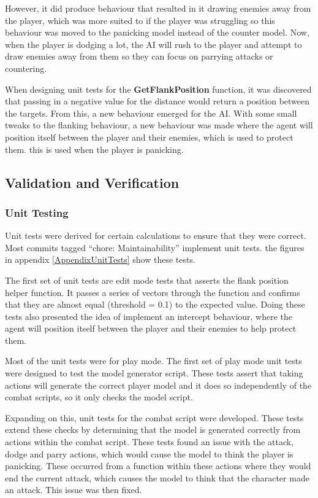 \documentclass{IEEEtran}
\begin{document}
However, it did produce behaviour that resulted in it drawing enemies away from the player, which was more suited to if the player was struggling so this behaviour was moved to the panicking model instead of the counter model. Now, when the player is dodging a lot, the AI will rush to the player and attempt to draw enemies away from them so they can focus on parrying attacks or countering.


When designing unit tests for the \textbf{GetFlankPosition} function, it was discovered that passing in a negative value for the distance would return a position between the targets. From this, a new behaviour emerged for the AI. With some small tweaks to the flanking behaviour, a new behaviour was made where the agent will position itself between the player and their enemies, which is used to protect them. this is used when the player is panicking.

\subsection{Validation and Verification}
\label{Validation}

\subsubsection{Unit Testing}

Unit tests were derived for certain calculations to ensure that they were correct. Most commits tagged “chore: Maintainability” implement unit tests. the figures in appendix \ref{AppendixUnitTests} show these tests.

The first set of unit tests are edit mode tests that asserts the flank position helper function. It passes a series of vectors through the function and confirms that they are almost equal (threshold = 0.1) to the expected value. Doing these tests also presented the idea of implement an intercept behaviour, where the agent will position itself between the player and their enemies to help protect them.

Most of the unit tests were for play mode. The first set of play mode unit tests were designed to test the model generator script. These tests assert that taking actions will generate the correct player model and it does so independently of the combat scripts, so it only checks the model script.

Expanding on this, unit tests for the combat script were developed. These tests extend these checks by determining that the model is generated correctly from actions within the combat script. These tests found an issue with the attack, dodge and parry actions, which would cause the model to think the player is panicking. These occurred from a function within these actions where they would end the current attack, which causes the model to think that the character made an attack. This issue was then fixed.
\end{document}
